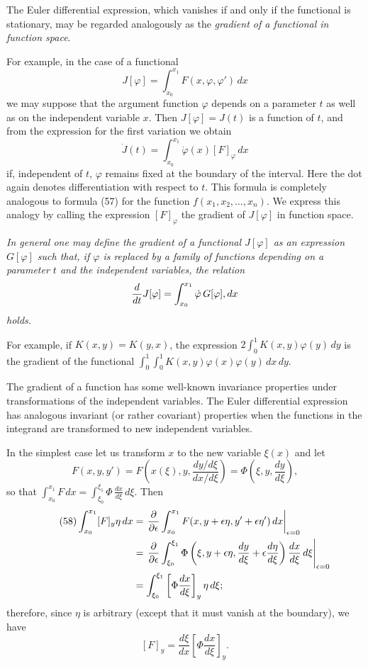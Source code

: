 The Euler differential expression, which vanishes if and only if the functional is stationary, may be regarded analogously as the \emph{gradient of a functional in function space}.

For example, in the case of a functional
\[
J[\varphi]=\int_{x_0}^{x_1}F(x,\varphi,\varphi')\,dx
\]
we may suppose that the argument function $\varphi$ depends on a parameter $t$ as well as on the independent variable $x$. Then $J[\varphi]=J(t)$ is a function of $t$, and from the expression for the first variation we obtain
\[
\dot J(t)=\int_{x_0}^{x_1}\dot\varphi(x)[F]_\varphi\,dx
\]
if, independent of $t$, $\varphi$ remains fixed at the boundary of the interval. Here the dot again denotes differentiation with respect to $t$. This formula is completely analogous to formula (57) for the function $f(x_1,x_2,\ldots,x_n)$. We express this analogy by calling the expression $[F]_\varphi$ the gradient of $J[\varphi]$ in function space.

\emph{In general one may define the gradient of a functional $J[\varphi]$ as an expression $G[\varphi]$ such that, if $\varphi$ is replaced by a family of functions depending on a parameter $t$ and the independent variables, the relation
\[
\frac{d}{dt}J[\varphi]=\int_{x_0}^{x_1}\dot\varphi\,G[\varphi]\\,dx
\]
holds.}

For example, if $K(x,y)=K(y,x)$, the expression $2\int_0^1K(x,y)\varphi(y)\,dy$ is the gradient of the functional $\int_0^1\int_0^1K(x,y)\varphi(x)\varphi(y)\,dx\,dy$.

The gradient of a function has some well-known invariance properties under transformations of the independent variables. The Euler differential expression has analogous invariant (or rather covariant) properties when the functions in the integrand are transformed to new independent variables.

In the simplest case let us transform $x$ to the new variable $\xi(x)$ and let
\[
F(x,y,y')=F\left(x(\xi),y,\frac{dy/d\xi}{dx/d\xi}\right)=\Phi\left(\xi,y,\frac{dy}{d\xi}\right),
\]
so that $\int_{x_0}^{x_1}F\,dx=\int_{\xi_0}^{\xi_1}\Phi\,\frac{dx}{d\xi}\,d\xi$. Then
\begin{align}\tag{58}
\int_{x_0}^{x_1}[F]_y\eta\,dx
&=\left.\frac{\partial}{\partial\epsilon}\int_{x_0}^{x_1}F(x,y+\epsilon\eta,y'+\epsilon\eta')\,dx\right|_{\epsilon=0}\notag\\
&=\left.\frac{\partial}{\partial\epsilon}\int_{\xi_0}^{\xi_1}\Phi\left(\xi,y+\epsilon\eta,\frac{dy}{d\xi}+\epsilon\frac{d\eta}{d\xi}\right)\frac{dx}{d\xi}\,d\xi\right|_{\epsilon=0}\notag\\
&=\int_{\xi_0}^{\xi_1}\left[\Phi\frac{dx}{d\xi}\right]_y\eta\,d\xi;
\end{align}
therefore, since $\eta$ is arbitrary (except that it must vanish at the boundary), we have
\begin{equation}\tag{59}
[F]_y=\frac{d\xi}{dx}\left[\Phi\frac{dx}{d\xi}\right]_y.
\end{equation}

